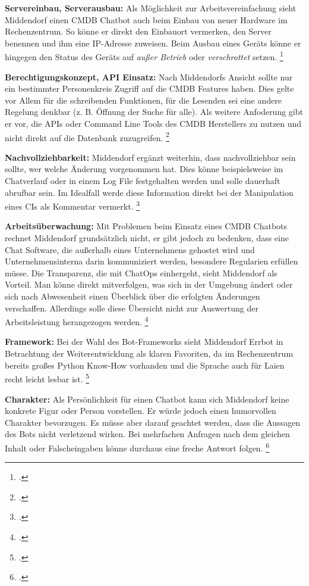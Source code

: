 \textbf{Servereinbau, Serverausbau: }Als Möglichkeit zur Arbeitsvereinfachung sieht Middendorf einen \acs{CMDB} Chatbot auch beim Einbau von neuer Hardware im Rechenzentrum. So könne er direkt den Einbauort vermerken, den Server benennen und ihm eine IP-Adresse zuweisen. Beim Ausbau eines Geräts könne er hingegen den Status des Geräts auf \textit{außer Betrieb} oder \textit{verschrottet} setzen.
\footcite[Vgl.][o. \pno]{Midd_2019}

\textbf{Berechtigungskonzept, API Einsatz: }Nach Middendorfs Ansicht sollte nur ein bestimmter Personenkreis Zugriff auf die \acs{CMDB} Features haben. Dies gelte vor Allem für die schreibenden Funktionen, für die Lesenden sei eine andere Regelung denkbar (z. B. Öffnung der Suche für alle).
Als weitere Anfoderung gibt er vor, die \acsp{API} oder Command Line Tools des \acs{CMDB} Herstellers zu nutzen und nicht direkt auf die Datenbank zuzugreifen.
\footcite[Vgl.][o. \pno]{Midd_2019}

\textbf{Nachvollziehbarkeit: }Middendorf ergänzt weiterhin, dass nachvollziehbar sein sollte, wer welche Änderung vorgenommen hat. Dies könne beispielsweise im Chatverlauf oder in einem Log File festgehalten werden und solle dauerhaft abrufbar sein. Im Idealfall werde diese Information direkt bei der Manipulation eines \acs{CI}s als Kommentar vermerkt.
\footcite[Vgl.][o. \pno]{Midd_2019}

\textbf{Arbeitsüberwachung: }Mit Problemen beim Einsatz eines \acs{CMDB} Chatbots rechnet Middendorf grundsätzlich nicht, er gibt jedoch zu bedenken, dass eine Chat Software, die außerhalb eines Unternehmens gehostet wird und Unternehmensinterna darin kommuniziert werden, besondere Regularien erfüllen müsse. Die Transparenz, die mit ChatOps einhergeht, sieht Middendorf als Vorteil. Man könne direkt mitverfolgen, was sich in der Umgebung ändert oder sich nach Abwesenheit einen Überblick über die erfolgten Änderungen verschaffen. Allerdings solle diese Übersicht nicht zur Auswertung der Arbeitsleistung herangezogen werden.
\footcite[Vgl.][o. \pno]{Midd_2019}

\textbf{Framework: }Bei der Wahl des Bot-Frameworks sieht Middendorf Errbot in Betrachtung der Weiterentwicklung als klaren Favoriten, da im Rechenzentrum bereits großes Python Know-How vorhanden und die Sprache auch für Laien recht leicht lesbar ist.
\footcite[Vgl.][o. \pno]{Midd_2019}

\textbf{Charakter: }Als Persönlichkeit für einen Chatbot kann sich Middendorf keine konkrete Figur oder Person vorstellen. Er würde jedoch einen humorvollen Charakter bevorzugen. Es müsse aber darauf geachtet werden, dass die Aussagen des Bots nicht verletzend wirken. Bei mehrfachen Anfragen nach dem gleichen Inhalt oder Falscheingaben könne durchaus eine freche Antwort folgen. 
\footcite[Vgl.][o. \pno]{Midd_2019}

